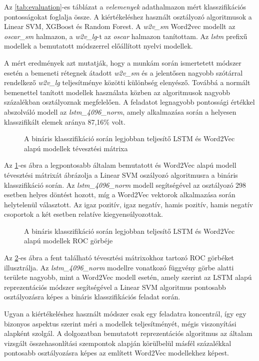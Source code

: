 Az \ref{tab:evaluation}-es táblázat a \textit{velemenyek} adathalmazon mért klasszifikációs pontosságokat foglalja össze. A kiértékeléshez használt osztályozó algoritmusok a Linear SVM, XGBoost és Random Forest. A \textit{w2v\_sm} Word2vec modellt az \textit{oscar\_sm} halmazon, a \textit{w2v\_lg}-t az \textit{oscar} halmazon tanítottam. Az \textit{lstm} prefixű modellek a bemutatott módszerrel előállított nyelvi modellek.

A mért eredmények azt mutatják, hogy a munkám során ismertetett módszer esetén a bemeneti rétegnek átadott \textit{w2v\_sm} és a jelentősen nagyobb szótárral rendelkező \textit{w2v\_lg} teljesítménye közötti különbség elenyésző. Továbbá a normált bemenettel tanított modellek használata közben az algoritmusok nagyobb százalékban osztályoznak megfelelően. A feladatot legnagyobb pontossági értékkel abszolváló modell az \textit{lstm\_4096\_norm}, amely alkalmazása során a helyesen klasszifikált elemek aránya 87,16\% volt.

\begin{figure}[H]
	\centering
	\caption{A bináris klasszifikáció során legjobban teljesítő LSTM és Word2Vec alapú modellek tévesztési mátrixa}
	\label{fig:matrix}
\end{figure}

Az \ref{fig:matrix}-es ábra a legpontosabb általam bemutatott és Word2Vec alapú modell tévesztési mátrixát ábrázolja a Linear SVM oszályozó algoritmusra a bináris klasszifikáció során. Az \textit{lstm\_4096\_norm} modell segítségével az osztályozó 298 esetben helyes döntést hozott, míg a Word2Vec vektorok alkalmazása során helytelenül választott. Az igaz pozitív, igaz negatív, hamis pozitív, hamis negatív csoportok a két esetben relatíve kiegyensúlyozottak.

\begin{figure}[H]
	\centering
	\caption{A bináris klasszifikáció során legjobban teljesítő LSTM és Word2Vec alapú modellek ROC görbéje}
	\label{fig:roc}
\end{figure}

Az \ref{fig:roc}-es ábra a fent található tévesztési mátrixokhoz tartozó ROC görbéket illusztrálja. Az \textit{lstm\_4096\_norm} modellre vonatkozó függvény görbe alatti területe nagyobb, mint a Word2Vec modell esetén, amely szerint az LSTM alapú reprezentációs módszer segítségével a Linear SVM algoritmus pontosabb osztályozásra képes a bináris klasszifikációs feladat során.

Ugyan a kiértékeléshez használt módszer csak egy feladatra koncentrál, így egy bizonyos aspektus szerint méri a modellek teljesítményét, mégis viszonyítási alapként szolgál. A dolgozatban bemutatott reprezentációs algoritmus az általam vizsgált összehasonlítási szempontok alapján körülbelül másfél százalékkal pontosabb osztályozásra képes az említett Word2Vec modellekhez képest.
